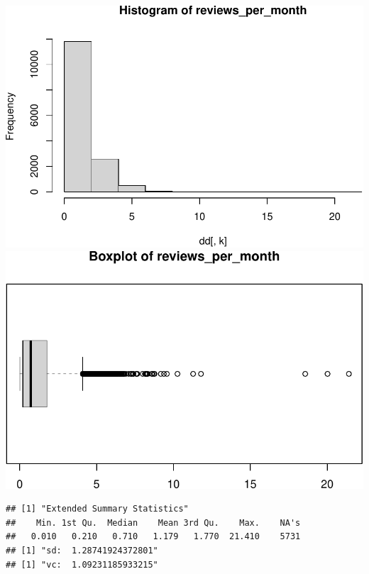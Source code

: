 \includegraphics{anal_files/figure-latex/unnamed-chunk-7-58.pdf}
\includegraphics{anal_files/figure-latex/unnamed-chunk-7-59.pdf}

\begin{verbatim}
## [1] "Extended Summary Statistics"
##    Min. 1st Qu.  Median    Mean 3rd Qu.    Max.    NA's 
##   0.010   0.210   0.710   1.179   1.770  21.410    5731 
## [1] "sd:  1.28741924372801"
## [1] "vc:  1.09231185933215"
\end{verbatim}
